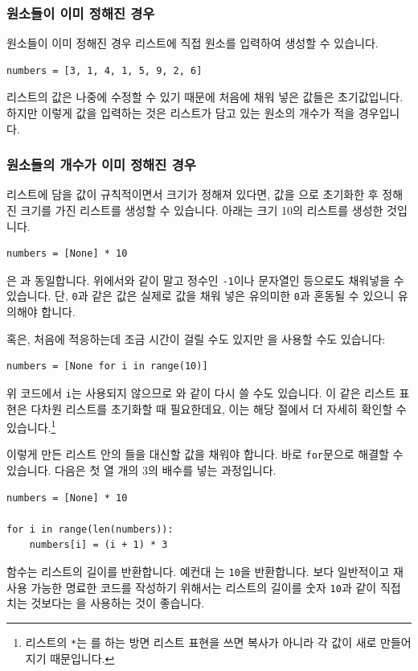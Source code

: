 \documentclass[../main.tex]{subfiles}
\begin{document}
\subsubsection{원소들이 이미 정해진 경우}
원소들이 이미 정해진 경우 리스트에 직접 원소를 입력하여 생성할 수 있습니다.
\begin{verbatim}
numbers = [3, 1, 4, 1, 5, 9, 2, 6]
\end{verbatim}
리스트의 값은 나중에 수정할 수 있기 때문에 처음에 채워 넣은 값들은 초기값입니다.
하지만 이렇게 값을 입력하는 것은 리스트가 담고 있는 원소의 개수가 적을 경우입니다.

\subsubsection{원소들의 개수가 이미 정해진 경우}
리스트에 담을 값이 규칙적이면서 크기가 정해져 있다면, 값을 으로 초기화한 후 정해진 크기를 가진 리스트를 생성할 수 있습니다.
아래는 크기 10의 리스트를 생성한 것입니다.
\begin{verbatim}
numbers = [None] * 10
\end{verbatim}
은 과 동일합니다.
위에서와 같이  말고 정수인 \texttt{-1}이나 문자열인  등으로도 채워넣을 수 있습니다.
단, \texttt{0}과 같은 값은 실제로 값을 채워 넣은 유의미한 \texttt{0}과 혼동될 수 있으니 유의해야 합니다.

혹은, 처음에 적응하는데 조금 시간이 걸릴 수도 있지만 을 사용할 수도 있습니다:
\begin{verbatim}
numbers = [None for i in range(10)]
\end{verbatim}
위 코드에서 \verb/i/는 사용되지 않으므로 와 같이 다시 쓸 수도 있습니다.
이 같은 리스트 표현은 다차원 리스트를 초기화할 때 필요한데요, 이는 해당 절에서 더 자세히 확인할 수 있습니다.\footnote{리스트의 \texttt{*}는 를 하는 방면 리스트 표현을 쓰면 복사가 아니라 각 값이 새로 만들어지기 때문입니다.}

이렇게 만든 리스트 안의 들을 대신할 값을 채워야 합니다.
바로 \texttt{for}문으로 해결할 수 있습니다.
다음은 첫 열 개의 3의 배수를 넣는 과정입니다.
\begin{verbatim}
numbers = [None] * 10

for i in range(len(numbers)):
    numbers[i] = (i + 1) * 3
\end{verbatim}
 함수는 리스트의 길이를 반환합니다.
예컨대 는 \texttt{10}을 반환합니다.
보다 일반적이고 재사용 가능한 명료한 코드를 작성하기 위해서는 리스트의 길이를 숫자 \texttt{10}과 같이 직접 치는 것보다는 을 사용하는 것이 좋습니다.
\end{document}
